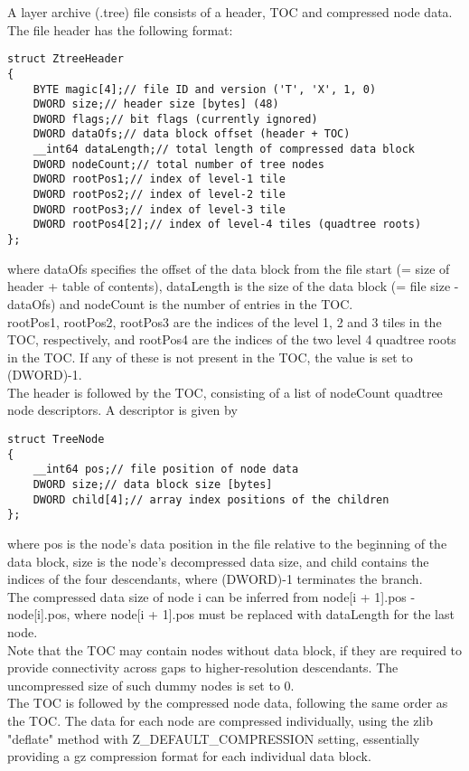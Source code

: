 \documentclass[Orbiter Developer Manual.tex]{subfiles}
\begin{document}
\noindent
A layer archive (.tree) file consists of a header, TOC and compressed node data. The file header has the following format:

\begin{lstlisting}
struct ZtreeHeader
{
	BYTE magic[4];// file ID and version ('T', 'X', 1, 0)
	DWORD size;// header size [bytes] (48)
	DWORD flags;// bit flags (currently ignored)
	DWORD dataOfs;// data block offset (header + TOC)
	__int64 dataLength;// total length of compressed data block
	DWORD nodeCount;// total number of tree nodes
	DWORD rootPos1;// index of level-1 tile
	DWORD rootPos2;// index of level-2 tile
	DWORD rootPos3;// index of level-3 tile
	DWORD rootPos4[2];// index of level-4 tiles (quadtree roots)
};
\end{lstlisting}

\noindent
where dataOfs specifies the offset of the data block from the file start (= size of header + table of contents), dataLength is the size of the data block (= file size - dataOfs) and nodeCount is the number of entries in the TOC.\\
rootPos1, rootPos2, rootPos3 are the indices of the level 1, 2 and 3 tiles in the TOC, respectively, and rootPos4 are the indices of the two level 4 quadtree roots in the TOC. If any of these is not present in the TOC, the value is set to (DWORD)-1.\\
The header is followed by the TOC, consisting of a list of nodeCount quadtree node descriptors. A descriptor is given by

\begin{lstlisting}
struct TreeNode
{
	__int64 pos;// file position of node data
	DWORD size;// data block size [bytes]
	DWORD child[4];// array index positions of the children
};
\end{lstlisting}

\noindent
where pos is the node's data position in the file relative to the beginning of the data block, size is the node's decompressed data size, and child contains the indices of the four descendants, where (DWORD)-1 terminates the branch.\\
The compressed data size of node i can be inferred from node[i + 1].pos - node[i].pos, where node[i + 1].pos must be replaced with dataLength for the last node.\\
Note that the TOC may contain nodes without data block, if they are required to provide connectivity across gaps to higher-resolution descendants. The uncompressed size of such dummy nodes is set to 0.\\
The TOC is followed by the compressed node data, following the same order as the TOC. The data for each node are compressed individually, using the zlib "deflate" method with Z\_DEFAULT\_COMPRESSION setting, essentially providing a gz compression format for each individual data block.
\end{document}
